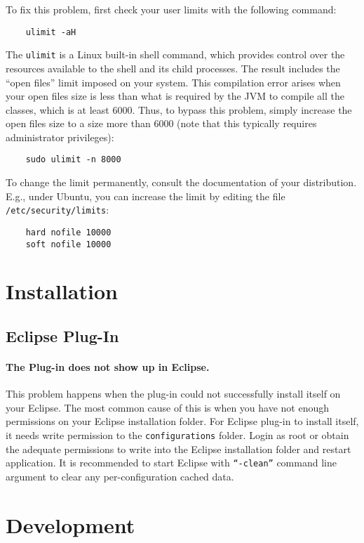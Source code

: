 \noindent To fix this problem, first check your user limits with the
following command:
\begin{verbatim}
    ulimit -aH
\end{verbatim}
The \texttt{ulimit} is a Linux built-in shell command, which provides
control over the resources available to the shell and its child
processes. The result includes the ``open files'' limit imposed on
your system. This compilation error arises when your open files
size is less than what is required by the JVM to compile all the
classes, which is at least 6000. Thus, to bypass this problem, simply
increase the open files size to a size more than 6000 (note that this
typically requires administrator privileges):
\begin{verbatim}
    sudo ulimit -n 8000
\end{verbatim}
To change the limit permanently, consult the documentation of your
distribution. E.g., under Ubuntu, you can increase the limit by
editing the file \verb=/etc/security/limits=:
\begin{verbatim}
    hard nofile 10000
    soft nofile 10000
\end{verbatim}

\section{Installation}
\subsection{Eclipse Plug-In}
\label{trouble:eclipse_install}
\paragraph{The Plug-in does not show up in Eclipse.} This problem happens when the plug-in could not successfully install itself on your Eclipse. The most common cause of this is when you have not enough permissions on your Eclipse installation folder. For Eclipse plug-in to install itself, it needs write permission to the \texttt{configurations} folder. Login as root or obtain the adequate permissions to write into the Eclipse installation folder and restart application.
It is recommended to start Eclipse with \texttt{``-clean''} command line argument to clear any per-configuration cached data.

\section{Development}
